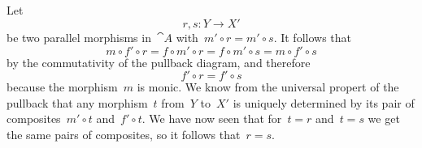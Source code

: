 \subsection{}

Let
\[
	r, s \colon Y \to X'
\]
be two parallel morphisms in~$\cat{A}$ with~$m' ∘ r = m' ∘ s$.
It follows that
\[
	m ∘ f' ∘ r
	=
	f ∘ m' ∘ r
	=
	f ∘ m' ∘ s
	=
	m ∘ f' ∘ s
\]
by the commutativity of the pullback diagram, and therefore
\[
	f' ∘ r = f' ∘ s
\]
because the morphism~$m$ is monic.
We know from the universal propert of the pullback that any morphism~$t$ from~$Y$ to~$X'$ is uniquely determined by its pair of composites~$m' ∘ t$ and~$f' ∘ t$.
We have now seen that for~$t = r$ and~$t = s$ we get the same pairs of composites, so it follows that~$r = s$.
